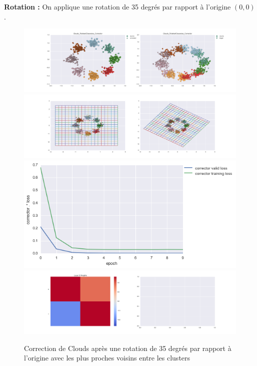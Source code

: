 
{\Large \textbf{Rotation :}} On applique une rotation de 35 degrés par rapport à l'origine $(0,0)$.

\begin{figure}[H] %
\centering
\includegraphics[width=\linewidth]{fig/24-05-2016/clouds/Clouds_RotatedClasswise_Corrector-DATA.png}
\includegraphics[width=\linewidth]{fig/24-05-2016/clouds/Clouds_RotatedClasswise_Corrector-GridCheck.png}
\includegraphics[width=0.45\linewidth]{fig/24-05-2016/clouds/Clouds_RotatedClasswise_Corrector-Learning_curve.png}
\includegraphics[width=\linewidth]{fig/24-05-2016/clouds/Clouds_RotatedClasswise_Corrector-W.png}
\caption{Correction de Clouds après une rotation de 35 degrés par rapport à l'origine avec les plus proches voisins entre les clusters}
\label{fig:recap-clouds-rot-classwise}
\end{figure}

